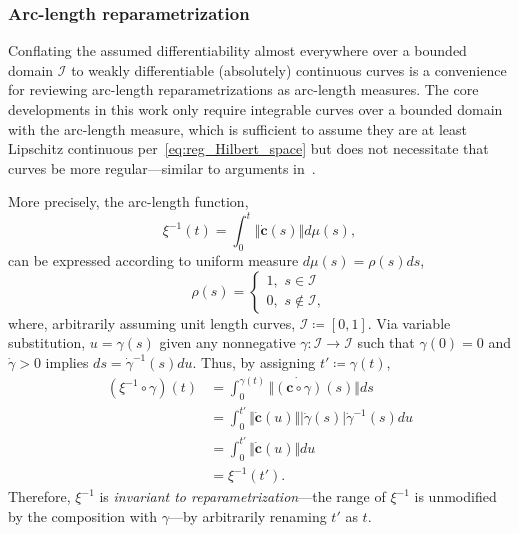 \documentclass[pdflatex,iicol]{sn-jnl}%
\theoremstyle{thmstyleone}%
\theoremstyle{thmstyletwo}%
\theoremstyle{thmstylethree}%
\begin{document}
\subsubsection{Arc-length reparametrization}
Conflating the assumed differentiability almost everywhere over a bounded domain $\mathcal{I}$ to weakly differentiable (absolutely) continuous curves is a convenience for reviewing arc-length reparametrizations as arc-length measures. The core developments in this work only require integrable curves over a bounded domain with the arc-length measure, which is sufficient to assume they are at least Lipschitz continuous per~\eqref{eq:reg_Hilbert_space} but does not necessitate that curves be more regular---similar to arguments in~\cite{srivastava2010shape,bruveris2016optimal}.

More precisely, the arc-length function,
\begin{equation}
    \xi^{-1}(t) = \int_{0}^t \Vert \dot{\boldsymbol{c}}(s) \Vert d\mu(s),
\end{equation}
can be expressed according to uniform measure $d\mu(s) = \rho(s)ds$, 
\begin{equation}
    \rho(s) = \begin{cases}
                    1, \,\, s \in \mathcal{I}\\
                    0, \,\, s \notin \mathcal{I},
              \end{cases}
\end{equation} 
where, arbitrarily assuming unit length curves, $\mathcal{I} \coloneqq [0,1]$. Via variable substitution, $u = \gamma(s)$ given any nonnegative $\gamma:\mathcal{I} \rightarrow\mathcal{I}$ such that $\gamma(0) = 0$ and $\dot{\gamma} > 0$ implies $ds = \dot{\gamma}^{-1}(s)du$. Thus, by assigning $t' \coloneqq \gamma(t)$,
\begin{align}
    (\xi^{-1}\circ \gamma)(t) &= \int_0^{\gamma(t)}\Vert \dot{(\boldsymbol{c}\circ \gamma)}(s)\Vert ds \\ \nonumber
    &= \int_0^{t'} \Vert \dot{\boldsymbol{c}}(u) \Vert \vert \dot{\gamma}(s) \vert \dot{\gamma}^{-1}(s)du \\ \nonumber
    &= \int_0^{t'}\Vert \dot{\boldsymbol{c}}(u) \Vert du\\ \nonumber
    &= \xi^{-1}(t')\nonumber.
\end{align}
Therefore, $\xi^{-1}$ is \textit{invariant to reparametrization}---the range of $\xi^{-1}$ is unmodified by the composition with $\gamma$---by arbitrarily renaming $t'$ as $t$. 
\end{document}

